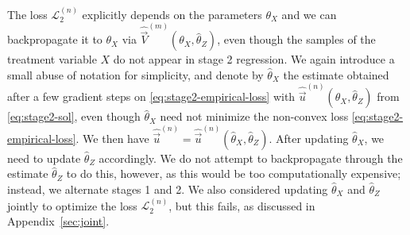 The loss $\mathcal{L}^{(n)}_2$ explicitly depends on the parameters $\theta_X$ and we can backpropagate it to $\theta_X$ via $\hat{\vec{V}}^{(m)}(\theta_X,\hat{\theta}_Z)$, 
even though the samples of the treatment variable $X$ do not appear in stage 2 regression.
We again introduce a small abuse of notation for simplicity, 
and denote by $\hat{\theta}_X$ the  estimate obtained after a few gradient steps on \eqref{eq:stage2-empirical-loss}
with $\hat{\vec{u}}^{(n)}(\theta_X,\hat\theta_Z)$ from \eqref{eq:stage2-sol},
even though $\hat{\theta}_X$ need not minimize the non-convex loss \eqref{eq:stage2-empirical-loss}. 
We then have 
$\hat{\vec{u}}^{(n)}=\hat{\vec{u}}^{(n)}(\hat{\theta}_X,\hat\theta_Z)$.
After updating $\hat{\theta}_X$, we need to update $\hat{\theta}_Z$ accordingly. We do not attempt to backpropagate through the estimate $\hat{\theta}_Z$ to do this, however, as this would be too computationally expensive; instead, we alternate stages 1 and 2. We also considered updating $\hat{\theta}_X$ and $\hat{\theta}_Z$ jointly to optimize the loss $\mathcal{L}_2^{(n)}$, but this fails, as discussed in Appendix~\ref{sec:joint}.
